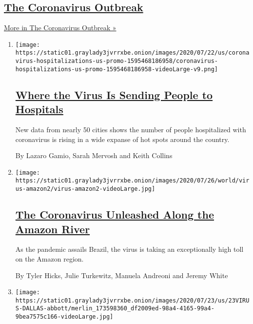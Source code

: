 \hypertarget{the-coronavirus-outbreak}{%
\subsection{\texorpdfstring{\href{/news-event/coronavirus}{The
Coronavirus
Outbreak}}{The Coronavirus Outbreak}}\label{the-coronavirus-outbreak}}

\href{/news-event/coronavirus}{More in The Coronavirus Outbreak »}

\begin{enumerate}
\def\labelenumi{\arabic{enumi}.}
\item
  \texttt{[image: https://static01.graylady3jvrrxbe.onion/images/2020/07/22/us/coronavirus-hospitalizations-us-promo-1595468186958/coronavirus-hospitalizations-us-promo-1595468186958-videoLarge-v9.png]}

  \hypertarget{where-the-virus-is-sending-people-to-hospitals}{%
  \subsection{\texorpdfstring{\href{/interactive/2020/07/23/us/coronavirus-hospitalizations-us.html}{Where
  the Virus Is Sending People to
  Hospitals}}{Where the Virus Is Sending People to Hospitals}}\label{where-the-virus-is-sending-people-to-hospitals}}

  New data from nearly 50 cities shows the number of people hospitalized
  with coronavirus is rising in a wide expanse of hot spots around the
  country.

  By Lazaro Gamio, Sarah Mervosh and Keith Collins
\item
  \texttt{[image: https://static01.graylady3jvrrxbe.onion/images/2020/07/26/world/virus-amazon2/virus-amazon2-videoLarge.jpg]}

  \hypertarget{the-coronavirus-unleashed-along-the-amazon-river}{%
  \subsection{\texorpdfstring{\href{/interactive/2020/07/25/world/americas/coronavirus-brazil-amazon.html}{The
  Coronavirus Unleashed Along the Amazon
  River}}{The Coronavirus Unleashed Along the Amazon River}}\label{the-coronavirus-unleashed-along-the-amazon-river}}

  As the pandemic assails Brazil, the virus is taking an exceptionally
  high toll on the Amazon region.

  By Tyler Hicks, Julie Turkewitz, Manuela Andreoni and Jeremy White
\item
  \texttt{[image: https://static01.graylady3jvrrxbe.onion/images/2020/07/23/us/23VIRUS-DALLAS-abbott/merlin\_173598360\_df2009ed-98a4-4165-99a4-9bea7575c166-videoLarge.jpg]}


\end{enumerate}
